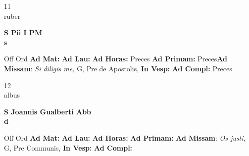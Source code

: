 \documentclass[10pt, openany]{book}
\begin{document}
    \begin{center}
        \begin{minipage}{3.5in}
            \vspace{2em}
            \begin{minipage}{0.5in}
                {\Huge 11} \\
                {\normalsize ruber}
            \end{minipage}
            \begin{minipage}{3.0in}
                \textbf{ \large S Pii I PM \\
                \textnormal{\normalsize s}}

            \end{minipage}
            \begin{justify}Off Ord
                \textbf{Ad Mat: }
                \textbf{Ad Lau: }
                \textbf{Ad Horas: }Preces
                \textbf{Ad Primam: }Preces\textbf{Ad Missam}: \textit{Si diligis me,} G, Pre de Apostolis, 
                \textbf{In Vesp: }
                \textbf{Ad Compl: }Preces
            \end{justify}
        \end{minipage}
    \end{center}

    \begin{center}
        \begin{minipage}{3.5in}
            \vspace{2em}
            \begin{minipage}{0.5in}
                {\Huge 12} \\
                {\normalsize albus}
            \end{minipage}
            \begin{minipage}{3.0in}
                \textbf{ \large S Joannis Gualberti Abb \\
                \textnormal{\normalsize d}}

            \end{minipage}
            \begin{justify}Off Ord
                \textbf{Ad Mat: }
                \textbf{Ad Lau: }
                \textbf{Ad Horas: }
                \textbf{Ad Primam: }\textbf{Ad Missam}: \textit{Os justi,} G, Pre Communis, 
                \textbf{In Vesp: }
                \textbf{Ad Compl: }
            \end{justify}
        \end{minipage}
    \end{center}
\end{document}
